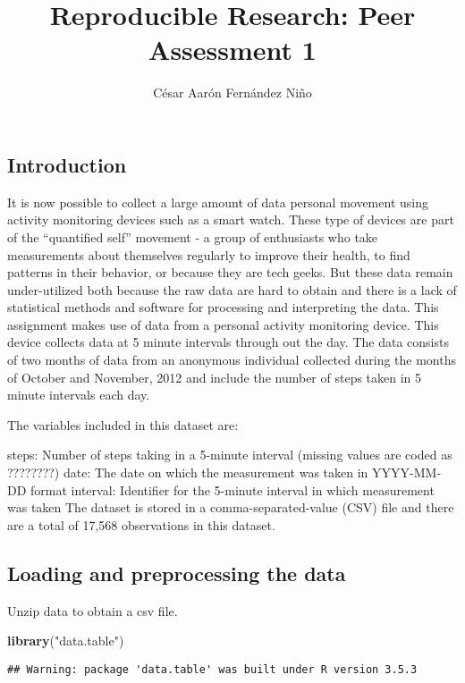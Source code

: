 \documentclass[]{article}
\title{Reproducible Research: Peer Assessment 1}
\author{César Aarón Fernández Niño}
\date{}
\newenvironment{Shaded}{\begin{snugshade}}{\end{snugshade}}
\newcommand{\KeywordTok}[1]{\textcolor[rgb]{0.13,0.29,0.53}{\textbf{#1}}}
\newcommand{\StringTok}[1]{\textcolor[rgb]{0.31,0.60,0.02}{#1}}
\newcommand{\NormalTok}[1]{#1}
\begin{document}
\maketitle

\subsection{Introduction}\label{introduction}

It is now possible to collect a large amount of data personal movement
using activity monitoring devices such as a smart watch. These type of
devices are part of the ``quantified self'' movement - a group of
enthusiasts who take measurements about themselves regularly to improve
their health, to find patterns in their behavior, or because they are
tech geeks. But these data remain under-utilized both because the raw
data are hard to obtain and there is a lack of statistical methods and
software for processing and interpreting the data. This assignment makes
use of data from a personal activity monitoring device. This device
collects data at 5 minute intervals through out the day. The data
consists of two months of data from an anonymous individual collected
during the months of October and November, 2012 and include the number
of steps taken in 5 minute intervals each day.

The variables included in this dataset are:

steps: Number of steps taking in a 5-minute interval (missing values are
coded as ????????) date: The date on which the measurement was taken in
YYYY-MM-DD format interval: Identifier for the 5-minute interval in
which measurement was taken The dataset is stored in a
comma-separated-value (CSV) file and there are a total of 17,568
observations in this dataset.

\subsection{Loading and preprocessing the
data}\label{loading-and-preprocessing-the-data}

Unzip data to obtain a csv file.

\begin{Shaded}
\begin{Highlighting}[]
\KeywordTok{library}\NormalTok{(}\StringTok{"data.table"}\NormalTok{)}
\end{Highlighting}
\end{Shaded}

\begin{verbatim}
## Warning: package 'data.table' was built under R version 3.5.3
\end{verbatim}
\end{document}
